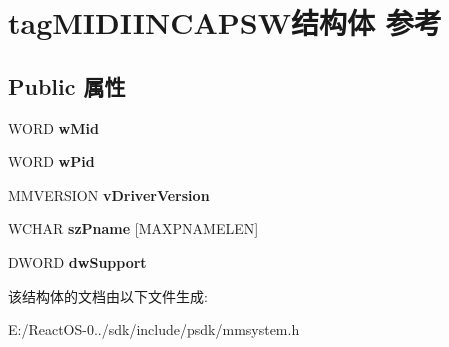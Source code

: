 \hypertarget{structtag_m_i_d_i_i_n_c_a_p_s_w}{}\section{tag\+M\+I\+D\+I\+I\+N\+C\+A\+P\+S\+W结构体 参考}
\label{structtag_m_i_d_i_i_n_c_a_p_s_w}
\subsection*{Public 属性}
\begin{DoxyCompactItemize}
\item 
\mbox{\label{structtag_m_i_d_i_i_n_c_a_p_s_w_a5b0c91c5e037c52d46488efd141ba762}} 
W\+O\+RD {\bfseries w\+Mid}
\item 
\mbox{\label{structtag_m_i_d_i_i_n_c_a_p_s_w_ac12d558961d32b9d618f15d6ee8fa30a}} 
W\+O\+RD {\bfseries w\+Pid}
\item 
\mbox{\label{structtag_m_i_d_i_i_n_c_a_p_s_w_a091bd256faec09c5e5d846e8af6f40cb}} 
M\+M\+V\+E\+R\+S\+I\+ON {\bfseries v\+Driver\+Version}
\item 
\mbox{\label{structtag_m_i_d_i_i_n_c_a_p_s_w_a48d750d4e3b9a1bf731078fe24a86fad}} 
W\+C\+H\+AR {\bfseries sz\+Pname} \mbox{[}M\+A\+X\+P\+N\+A\+M\+E\+L\+EN\mbox{]}
\item 
\mbox{\label{structtag_m_i_d_i_i_n_c_a_p_s_w_a0f494a9c88c24b3aa131812fdec9e1e0}} 
D\+W\+O\+RD {\bfseries dw\+Support}
\end{DoxyCompactItemize}


该结构体的文档由以下文件生成\+:\begin{DoxyCompactItemize}
\item 
E\+:/\+React\+O\+S-\/0../sdk/include/psdk/mmsystem.\+h\end{DoxyCompactItemize}
